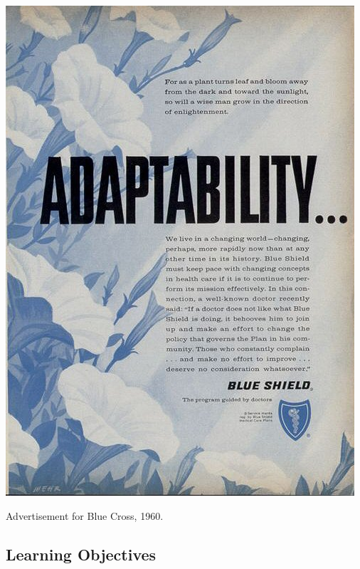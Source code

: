 \begin{refsection}
\begin{itemize}
\end{itemize}

\begin{marginfigure}
 \begin{center}


     \includegraphics[scale=0.25]{../images/md28530.jpg}
\end{center}
 \caption{Advertisement for Blue Cross, 1960.}
\label{fig: BlueCross}
\end{marginfigure}


\newpage

\subsection{Learning Objectives}
\label{learningobjectives}


\end{refsection}
